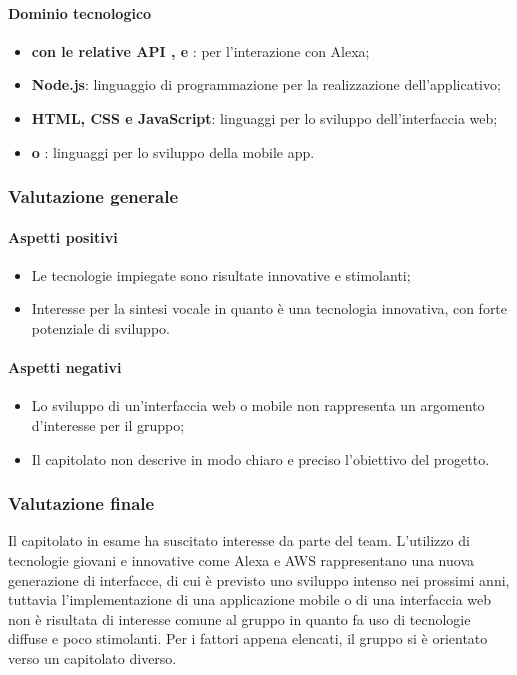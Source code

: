 \paragraph{Dominio tecnologico}
\begin{itemize}
	\item {\textbf{ con le relative API  ,  e }: per l'interazione con Alexa};
	\item  \textbf{Node.js}: linguaggio di programmazione per la realizzazione dell'applicativo;
	\item \textbf{HTML, CSS e JavaScript}: linguaggi per lo sviluppo dell'interfaccia web;
	\item  \textbf{ o }: linguaggi per lo sviluppo della mobile app.
\end{itemize}
\subsubsection{Valutazione generale}
\paragraph{Aspetti positivi}
\begin{itemize}
	\item{Le tecnologie impiegate sono risultate innovative e stimolanti;}
	\item{Interesse per la sintesi vocale in quanto è una tecnologia innovativa, con forte potenziale di sviluppo.}
\end{itemize}
\paragraph{Aspetti negativi}
\begin{itemize}
	\item{Lo sviluppo di un'interfaccia web o mobile non rappresenta un argomento d'interesse per il gruppo;}
	\item{Il capitolato non descrive in modo chiaro e preciso l'obiettivo del progetto.}
\end{itemize}
\subsubsection{Valutazione finale}
Il capitolato in esame ha suscitato interesse da parte del team. L'utilizzo di tecnologie giovani e innovative come Alexa e AWS rappresentano una nuova generazione di interfacce, di cui è previsto uno sviluppo intenso nei prossimi anni, tuttavia l'implementazione di una applicazione mobile o di una interfaccia web non è risultata di interesse comune al gruppo in quanto fa uso di tecnologie diffuse e poco stimolanti.
Per i fattori appena elencati, il gruppo si è orientato verso un capitolato diverso.

